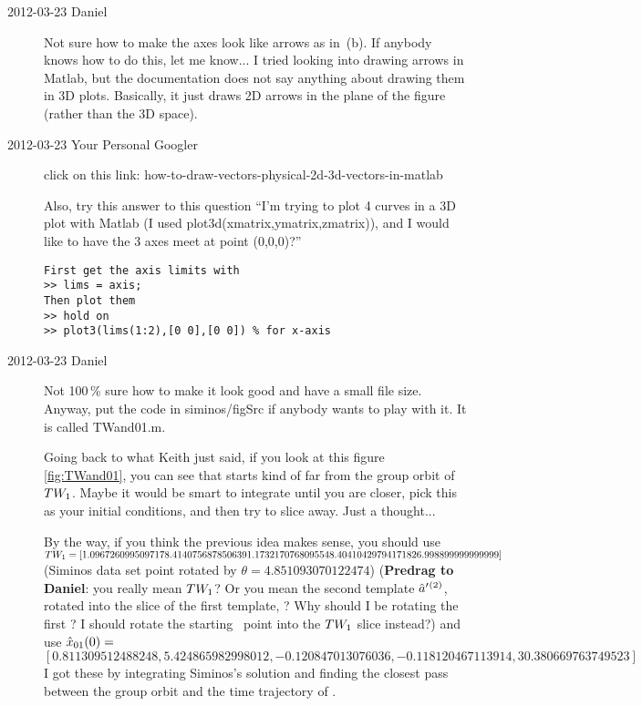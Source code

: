 \begin{description}
\item[2012-03-23 Daniel~~]
Not sure how to make the axes look like arrows as in
\,{(b)}. If anybody knows how to do this, let me
know... I tried looking into drawing arrows in Matlab, but the
documentation does not say anything about drawing them in 3D plots.
Basically, it just draws 2D arrows in the plane of the figure (rather
than the 3D space).

\item[2012-03-23 Your Personal Googler] click on this link:
{how-to-draw-vectors-physical-2d-3d-vectors-in-matlab}

Also, try this answer to this question
``I'm trying to plot 4 curves in a 3D plot with Matlab (I used
plot3d(xmatrix,ymatrix,zmatrix)), and I would like to have the 3 axes
meet at point (0,0,0)?''
\begin{verbatim}
First get the axis limits with
>> lims = axis;
Then plot them
>> hold on
>> plot3(lims(1:2),[0 0],[0 0]) % for x-axis
\end{verbatim}


\item[2012-03-23 Daniel~~]
Not 100\,\% sure how to make it look good and have a small file size.
Anyway, put the code in siminos/figSrc if anybody wants to play with it. It is
called TWand01.m.

Going back to what Keith just said, if you look at this figure
\ref{fig:TWand01}, you can see that  starts kind of far
from the group orbit of $TW_{1}$. Maybe it would be smart to
integrate until you are closer, pick this as your initial conditions, and
then try to slice away. Just a thought...

By the way, if you think the previous idea makes sense, you should use
\\
$TW_{1} = [1.096726099509717   8.414075687850639   1.173217076809554   8.404104297941718  26.998899999999999]$
\\
(Siminos  data set point rotated by $\theta =
4.851093070122474$) ({\bf Predrag to Daniel}: you really mean
$TW_{1}$? Or you mean the second template $\hat{a}'{}^{(2)}$, rotated
into the slice of the first template, ? Why
should I be rotating the first \template? I should rotate the starting
\rpo\ point into the $TW_{1}$ slice instead?) and use
$\hat{x}_{01}(0) = $
\\
$[0.811309512488248, 5.424865982998012, -0.120847013076036, -0.118120467113914, 30.380669763749523]$
\\
I got these by integrating Siminos's solution and finding the closest
pass between the group orbit and the time trajectory of .


\end{description}
